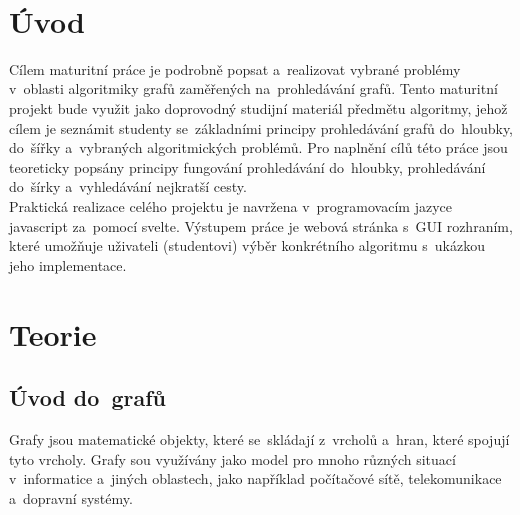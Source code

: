 \documentclass[12pt, titlepage, a4paper]{article}
\begin{document}
\\

\\
\\
\\

\\
\\

\\

\\
\thispagestyle{empty}
\clearpage
\tableofcontents
\thispagestyle{empty}
\clearpage
\setcounter{page}{7}
\section{Úvod}

Cílem maturitní práce je podrobně popsat a~realizovat vybrané problémy v~oblasti 
algoritmiky grafů zaměřených na~prohledávání grafů.
Tento maturitní projekt bude využit jako doprovodný studijní materiál předmětu 
algoritmy, jehož cílem je seznámit studenty se~základními principy 
prohledávání grafů do~hloubky, do~šířky a~vybraných algoritmických problémů. 
Pro naplnění cílů této práce jsou teoreticky popsány principy fungování prohledávání do~hloubky,
prohledávání do~šírky a~vyhledávání nejkratší cesty.
\\

Praktická realizace celého projektu je navržena v~programovacím jazyce javascript za~pomocí svelte. 
Výstupem práce je webová stránka s~GUI rozhraním, které umožňuje uživateli (studentovi) výběr konkrétního 
algoritmu s~ukázkou jeho implementace.

\clearpage

\section{Teorie}
\subsection{Úvod do~grafů}
Grafy jsou matematické objekty, které se~skládají z~vrcholů a~hran, které spojují tyto 
vrcholy. Grafy sou využívány jako model pro mnoho různých situací v~informatice a~jiných 
oblastech, jako například počítačové sítě, telekomunikace a~dopravní systémy.
\\
\end{document}
